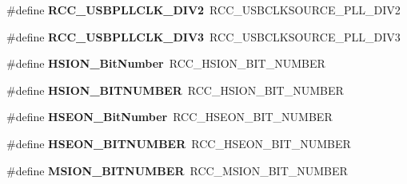 \begin{DoxyCompactItemize}
\item 
\#define {\bfseries R\+C\+C\+\_\+\+U\+S\+B\+P\+L\+L\+C\+L\+K\+\_\+\+D\+I\+V2}~R\+C\+C\+\_\+\+U\+S\+B\+C\+L\+K\+S\+O\+U\+R\+C\+E\+\_\+\+P\+L\+L\+\_\+\+D\+I\+V2\hypertarget{group___h_a_l___r_c_c___aliased_gabe13349c49b3ef0401d97c2b748ffe7b}{}\label{group___h_a_l___r_c_c___aliased_gabe13349c49b3ef0401d97c2b748ffe7b}

\item 
\#define {\bfseries R\+C\+C\+\_\+\+U\+S\+B\+P\+L\+L\+C\+L\+K\+\_\+\+D\+I\+V3}~R\+C\+C\+\_\+\+U\+S\+B\+C\+L\+K\+S\+O\+U\+R\+C\+E\+\_\+\+P\+L\+L\+\_\+\+D\+I\+V3\hypertarget{group___h_a_l___r_c_c___aliased_ga895e6eac56d6689996989b9417c9ad62}{}\label{group___h_a_l___r_c_c___aliased_ga895e6eac56d6689996989b9417c9ad62}

\item 
\#define {\bfseries H\+S\+I\+O\+N\+\_\+\+Bit\+Number}~R\+C\+C\+\_\+\+H\+S\+I\+O\+N\+\_\+\+B\+I\+T\+\_\+\+N\+U\+M\+B\+ER\hypertarget{group___h_a_l___r_c_c___aliased_ga3d3085e491cbef815d223afbe5bf1930}{}\label{group___h_a_l___r_c_c___aliased_ga3d3085e491cbef815d223afbe5bf1930}

\item 
\#define {\bfseries H\+S\+I\+O\+N\+\_\+\+B\+I\+T\+N\+U\+M\+B\+ER}~R\+C\+C\+\_\+\+H\+S\+I\+O\+N\+\_\+\+B\+I\+T\+\_\+\+N\+U\+M\+B\+ER\hypertarget{group___h_a_l___r_c_c___aliased_ga79f147c8b2f8fe05574f861483be5aa4}{}\label{group___h_a_l___r_c_c___aliased_ga79f147c8b2f8fe05574f861483be5aa4}

\item 
\#define {\bfseries H\+S\+E\+O\+N\+\_\+\+Bit\+Number}~R\+C\+C\+\_\+\+H\+S\+E\+O\+N\+\_\+\+B\+I\+T\+\_\+\+N\+U\+M\+B\+ER\hypertarget{group___h_a_l___r_c_c___aliased_ga7b52a4205001d305fb5ef1d6b5bfd2cd}{}\label{group___h_a_l___r_c_c___aliased_ga7b52a4205001d305fb5ef1d6b5bfd2cd}

\item 
\#define {\bfseries H\+S\+E\+O\+N\+\_\+\+B\+I\+T\+N\+U\+M\+B\+ER}~R\+C\+C\+\_\+\+H\+S\+E\+O\+N\+\_\+\+B\+I\+T\+\_\+\+N\+U\+M\+B\+ER\hypertarget{group___h_a_l___r_c_c___aliased_ga6ca813609511152216b194e490bef027}{}\label{group___h_a_l___r_c_c___aliased_ga6ca813609511152216b194e490bef027}

\item 
\#define {\bfseries M\+S\+I\+O\+N\+\_\+\+B\+I\+T\+N\+U\+M\+B\+ER}~R\+C\+C\+\_\+\+M\+S\+I\+O\+N\+\_\+\+B\+I\+T\+\_\+\+N\+U\+M\+B\+ER\hypertarget{group___h_a_l___r_c_c___aliased_ga269ef9e8d23c9ea0c0a0df0d361c3467}{}\label{group___h_a_l___r_c_c___aliased_ga269ef9e8d23c9ea0c0a0df0d361c3467}


\end{DoxyCompactItemize}
